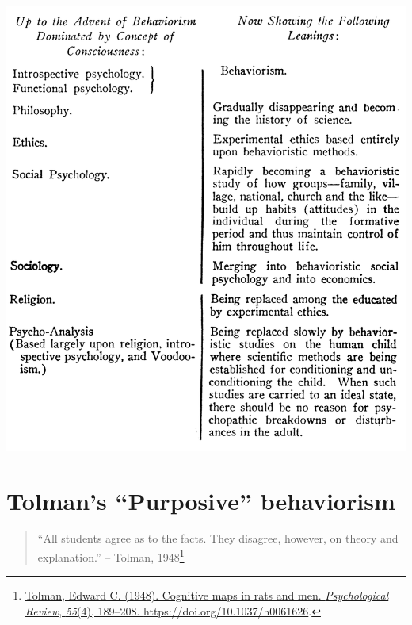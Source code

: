 \documentclass[
  oneside,
  12pt]{crumpbook}
\begin{document}
\begin{center}\includegraphics[width=1\linewidth]{imgs/Watson_sweep} \end{center}

\hypertarget{tolmans-purposive-behaviorism}{%
\section{Tolman's ``Purposive'' behaviorism}\label{tolmans-purposive-behaviorism}}

\begin{quote}
``All students agree as to the facts. They disagree, however, on theory and explanation.'' -- Tolman, 1948\footnote{\protect\hyperlink{ref-tolmanCognitiveMapsRats1948}{Tolman, Edward C. (1948). Cognitive maps in rats and men. \emph{Psychological Review}, \emph{55}(4), 189--208. \url{https://doi.org/10.1037/h0061626}}.}
\end{quote}
\end{document}
